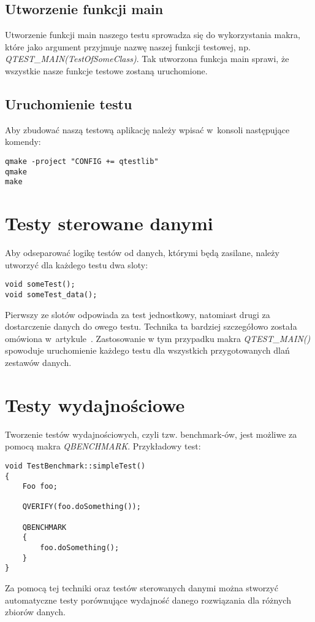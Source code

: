 \documentclass[11pt,twoside,a4paper,final]{article}
\begin{document}
\subsection{Utworzenie funkcji main}
Utworzenie funkcji main naszego testu sprowadza się do wykorzystania makra, które jako argument przyjmuje nazwę naszej funkcji testowej, np.\newline 
\textit{QTEST\_MAIN(TestOfSomeClass)}. Tak utworzona funkcja main sprawi, że wszystkie nasze funkcje testowe zostaną uruchomione.

\subsection{Uruchomienie testu}
Aby zbudować naszą testową aplikację należy wpisać w~konsoli następujące komendy:
\begin{lstlisting}
qmake -project "CONFIG += qtestlib"
qmake
make
\end{lstlisting}

\section{Testy sterowane danymi}
Aby odseparować logikę testów od danych, którymi będą zasilane, należy utworzyć dla każdego testu dwa sloty:
\begin{lstlisting}
void someTest();
void someTest_data();
\end{lstlisting}
Pierwszy ze slotów odpowiada za test jednostkowy, natomiast drugi za dostarczenie danych do owego testu. Technika ta bardziej szczegółowo została omówiona w~artykule~\cite{datadriven}.
Zastosowanie w tym przypadku makra \textit{QTEST\_MAIN()} spowoduje uruchomienie każdego testu dla wszystkich przygotowanych dlań zestawów danych.

\section{Testy wydajnościowe}
Tworzenie testów wydajnościowych, czyli tzw. benchmark-ów, jest możliwe za pomocą makra \textit{QBENCHMARK}. Przykładowy test:
\begin{lstlisting}
void TestBenchmark::simpleTest()
{
	Foo foo;

	QVERIFY(foo.doSomething());

	QBENCHMARK 
	{
		foo.doSomething();
	}
}
\end{lstlisting}

Za pomocą tej techniki oraz testów sterowanych danymi można stworzyć automatyczne testy porównujące wydajność danego rozwiązania dla różnych zbiorów danych.
\end{document}
